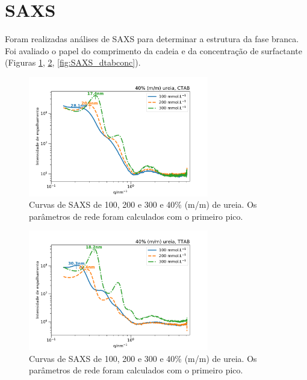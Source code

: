	\FloatBarrier
\section{SAXS}

	Foram realizadas análises de SAXS para determinar a estrutura da fase branca. Foi avaliado o papel do comprimento da cadeia e da concentração de surfactante (Figuras \ref{fig:SAXS_ctabconc}, \ref{fig:SAXS_ttabconc}, \ref{fig:SAXS_dtabconc}).
	
	\begin{figure}[h]
		\centering
		\includegraphics[width=0.7\textwidth]{imagens/saxs/CTAB_conc}
		\caption{Curvas de SAXS de \CTAB{} 100, 200 e 300 \mM{} e 40\% (m/m) de ureia. Os parâmetros de rede foram calculados com o primeiro pico.}
		\label{fig:SAXS_ctabconc}
	\end{figure}
	
	\begin{figure}[h]
		\centering
		\includegraphics[width=0.7\textwidth]{imagens/saxs/TTAB_conc}
		\caption{Curvas de SAXS de \TTAB{} 100, 200 e 300 \mM{} e 40\% (m/m) de ureia. Os parâmetros de rede foram calculados com o primeiro pico.}
		\label{fig:SAXS_ttabconc}
	\end{figure}
	
